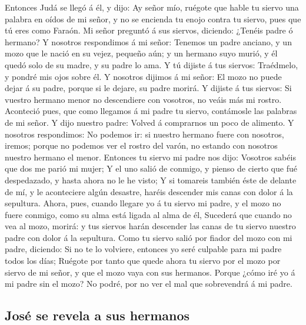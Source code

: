  Entonces Judá se llegó á él, y dijo: Ay señor mío,
ruégote que hable tu siervo una palabra en oídos de mi señor, y no se
encienda tu enojo contra tu siervo, pues que tú eres como Faraón.
 Mi señor preguntó á sus siervos, diciendo: ¿Tenéis padre
ó hermano?  Y nosotros respondimos á mi señor: Tenemos un
padre anciano, y un mozo que le nació en su vejez, pequeño aún; y un
hermano suyo murió, y él quedó solo de su madre, y su padre lo ama.
 Y tú dijiste á tus siervos: Traédmelo, y pondré mis ojos
sobre él.  Y nosotros dijimos á mi señor: El mozo no
puede dejar á su padre, porque si le dejare, su padre morirá.
 Y dijiste á tus siervos: Si vuestro hermano menor no
descendiere con vosotros, no veáis más mi rostro. 
Aconteció pues, que como llegamos á mi padre tu siervo, contámosle las
palabras de mi señor.  Y dijo nuestro padre: Volved á
comprarnos un poco de alimento.  Y nosotros respondimos:
No podemos ir: si nuestro hermano fuere con nosotros, iremos; porque no
podemos ver el rostro del varón, no estando con nosotros nuestro hermano
el menor.  Entonces tu siervo mi padre nos dijo: Vosotros
sabéis que dos me parió mi mujer;  Y el uno salió de
conmigo, y pienso de cierto que fué despedazado, y hasta ahora no le he
visto;  Y si tomareis también éste de delante de mí, y le
aconteciere algún desastre, haréis descender mis canas con dolor á la
sepultura.  Ahora, pues, cuando llegare yo á tu siervo mi
padre, y el mozo no fuere conmigo, como su alma está ligada al alma de
él,  Sucederá que cuando no vea al mozo, morirá: y tus
siervos harán descender las canas de tu siervo nuestro padre con dolor á
la sepultura.  Como tu siervo salió por fiador del mozo
con mi padre, diciendo: Si no te lo volviere, entonces yo seré culpable
para mi padre todos los días;  Ruégote por tanto que
quede ahora tu siervo por el mozo por siervo de mi señor, y que el mozo
vaya con sus hermanos.  Porque ¿cómo iré yo á mi padre
sin el mozo? No podré, por no ver el mal que sobrevendrá á mi padre.

\hypertarget{josuxe9-se-revela-a-sus-hermanos}{%
\subsection{José se revela a sus
hermanos}\label{josuxe9-se-revela-a-sus-hermanos}}

